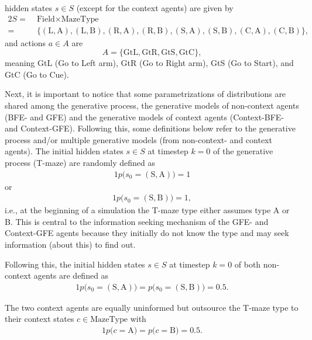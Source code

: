 hidden states \(s \in S\) (except for the context agents) are given by
\begin{alignat}{2}
    S =\; & \text{Field} \times \text{MazeType}                                                                                                                                  \nonumber \\
    =\;   & \{(\text{L},\text{A}),(\text{L},\text{B}),(\text{R},\text{A}),(\text{R},\text{B}),(\text{S},\text{A}),(\text{S},\text{B}),(\text{C},\text{A}),(\text{C},\text{B})\},
\end{alignat}
and actions \(a \in A\) are
\begin{equation}
    A = \{\text{GtL},\text{GtR},\text{GtS},\text{GtC}\},
\end{equation}
meaning GtL (Go to Left arm), GtR (Go to Right arm), GtS (Go to Start), and GtC (Go to Cue).

Next, it is important to notice that some parametrizations of distributions are shared among the generative process, the generative models of non-context agents (BFE- and GFE) and the generative models of context agents (Context-BFE- and Context-GFE). Following this, some definitions below refer to the generative process and/or multiple generative models (from non-context- and context agents). 
The initial hidden states \(s \in S\) at timestep \(k=0\) of the generative process (T-maze) are randomly defined as
\begin{alignat}{1}
    p\bigl(s_0=(\text{S},\text{A})\bigr)=1
\end{alignat}
or
\begin{alignat}{1}
    p\bigl(s_0=(\text{S},\text{B})\bigr)=1,
\end{alignat}
i.e., at the beginning of a simulation the T-maze type either assumes type A or B. This is central to the information seeking mechanism of the GFE- and Context-GFE agents because they initially do not know the type and may seek information (about this) to find out.

Following this, the initial hidden states \(s \in S\) at timestep \(k=0\) of both non-context agents are defined as
\begin{alignat}{1}
    p\bigl(s_0=(\text{S},\text{A})\bigr)=p\bigl(s_0=(\text{S},\text{B})\bigr)=0.5.
\end{alignat}

The two context agents are equally uninformed but outsource the T-maze type to their context states \(c \in \text{MazeType}\) with
\begin{alignat}{1}
    p\bigl(c=\text{A}\bigr)=p\bigl(c=\text{B}\bigr)=0.5.
\end{alignat}

